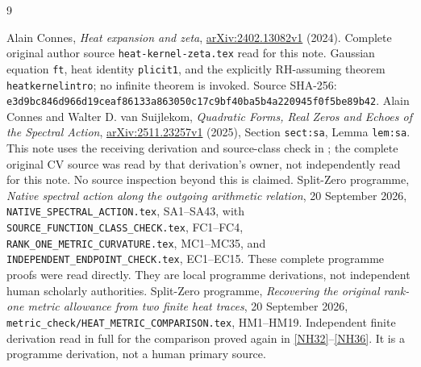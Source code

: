 \documentclass[11pt]{article}
\begin{document}
\begin{thebibliography}{9}\raggedright
{}
Alain Connes, \emph{Heat expansion and zeta},
\href{https://arxiv.org/abs/2402.13082v1}{arXiv:2402.13082v1}
(2024). Complete original author source
\texttt{heat-kernel-zeta.tex} read for this note.
Gaussian equation \texttt{ft}, heat identity \texttt{plicit1},
and the explicitly RH-assuming theorem
\texttt{heatkernelintro}; no infinite theorem is invoked.
Source SHA-256:
\texttt{e3d9bc846d966d19ceaf86133a863050c17c9bf40ba5b4a220945f0f5be89b42}.
Alain Connes and Walter D. van Suijlekom,
\emph{Quadratic Forms, Real Zeros and Echoes of the Spectral Action},
\href{https://arxiv.org/abs/2511.23257v1}{arXiv:2511.23257v1}
(2025), Section \texttt{sect:sa}, Lemma \texttt{lem:sa}.
This note uses the receiving derivation and source-class
check in \cite{NativeAction}; the complete original CV
source was read by that derivation's owner, not independently
read for this note. No source inspection beyond this is claimed.
Split-Zero programme, \emph{Native spectral action along the
outgoing arithmetic relation}, 20 September 2026,
\texttt{NATIVE\_SPECTRAL\_ACTION.tex}, SA1--SA43, with
\texttt{SOURCE\_FUNCTION\_CLASS\_CHECK.tex}, FC1--FC4,
\texttt{RANK\_ONE\_METRIC\_CURVATURE.tex}, MC1--MC35, and
\texttt{INDEPENDENT\_ENDPOINT\_CHECK.tex}, EC1--EC15.
These complete programme proofs were read directly.
They are local programme derivations, not independent
human scholarly authorities.
Split-Zero programme, \emph{Recovering the original rank-one
metric allowance from two finite heat traces},
20 September 2026,
\texttt{metric\_check/HEAT\_METRIC\_COMPARISON.tex},
HM1--HM19. Independent finite derivation read in full
for the comparison proved again in \eqref{NH32}--\eqref{NH36}.
It is a programme derivation, not a human primary source.
\end{thebibliography}
\end{document}
